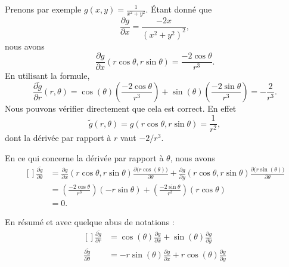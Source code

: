Prenons par exemple $g(x,y)=\frac{1}{ x^2+y^2 }$. Étant donné que
\begin{equation}
    \frac{ \partial g }{ \partial x }=\frac{ -2x }{ (x^2+y^2)^2 },
\end{equation}
nous avons
\begin{equation}
    \frac{ \partial g }{ \partial x }(r\cos\theta,r\sin\theta)=\frac{ -2\cos\theta }{ r^3 }.
\end{equation}
En utilisant la formule,
\begin{equation}
    \frac{ \partial \tilde g }{ \partial r }(r,\theta)=\cos(\theta)\left( \frac{ -2\cos\theta }{ r^3 } \right)+\sin(\theta)\left( \frac{ -2\sin\theta }{ r^3 } \right)=-\frac{ 2 }{ r^3 }.
\end{equation}
Nous pouvons vérifier directement que cela est correct. En effet
\begin{equation}
    \tilde g(r,\theta)=g(r\cos\theta,r\sin\theta)=\frac{1}{ r^2 },
\end{equation}
dont la dérivée par rapport à $r$ vaut $-2/r^3$.

En ce qui concerne la dérivée par rapport à $\theta$, nous avons
\begin{equation}
    \begin{aligned}[]
    \frac{ \partial \tilde g }{ \partial \theta }&=\frac{ \partial g }{ \partial x }(r\cos\theta,r\sin\theta)\frac{ \partial \big( r\cos(\theta) \big) }{ \partial \theta }+\frac{ \partial g }{ \partial y }(r\cos\theta,r\sin\theta)\frac{ \partial \big( r\sin(\theta) \big) }{ \partial \theta }\\
    &=\left( \frac{ -2\cos\theta }{ r^3 } \right)(-r\sin\theta)+\left( \frac{ -2\sin\theta }{ r^3 } \right)(r\cos\theta)\\
    &=0.
    \end{aligned}
\end{equation}

En résumé et avec quelque abus de notations :
\begin{equation}
    \begin{aligned}[]
        \frac{ \partial \tilde g }{ \partial r }&=\cos(\theta)\frac{ \partial g }{ \partial x }+\sin(\theta)\frac{ \partial g }{ \partial y }\\
        \frac{ \partial \tilde g }{ \partial \theta }&=-r\sin(\theta)\frac{ \partial g }{ \partial x }+r\cos(\theta)\frac{ \partial g }{ \partial y }\\
    \end{aligned}
\end{equation}

